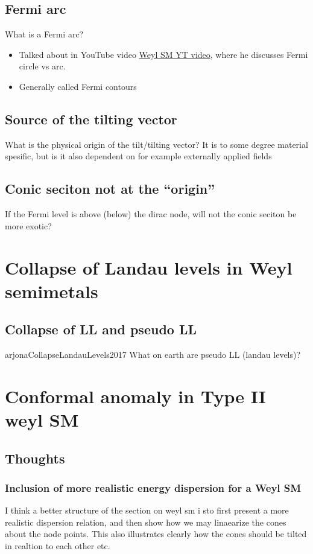 \documentclass[11pt]{article}
\begin{document}
\subsection{Fermi arc}
\label{sec:org850f04a}
What is a Fermi arc?
\begin{itemize}
\item Talked about in YouTube video \hyperref[sec:org7941e69]{Weyl SM YT video}, where he discusses Fermi circle vs arc.
\item Generally called Fermi contours
\end{itemize}

\subsection{Source of the tilting vector}
\label{sec:orgb0a8226}
What is the physical origin of the tilt/tilting vector?
It is to some degree material spesific, but is it also dependent on for example externally applied fields

\subsection{Conic seciton not at the ``origin''}
\label{sec:org0714e07}
If the Fermi level is above (below) the dirac node, will not the conic seciton be more exotic?

\section{Collapse of Landau levels in Weyl semimetals}
\label{sec:org98006f5}
\subsection{Collapse of LL and pseudo LL}
\label{sec:org9f33a90}
arjonaCollapseLandauLevels2017
What on earth are pseudo LL (landau levels)?

\section{Conformal anomaly in Type II weyl SM}
\label{sec:org782ec04}

\subsection{Thoughts}
\label{sec:orgfee921d}

\subsubsection{Inclusion of more realistic energy dispersion for a Weyl SM}
\label{sec:org855f368}
I think a better structure of the section on weyl sm i sto first present a more realistic dispersion relation, and then show how we may linaearize the cones about the node points.
This also illustrates clearly how the cones should be tilted in realtion to each other etc.
\end{document}
